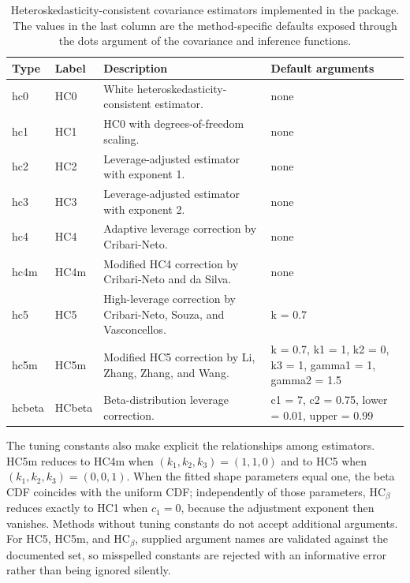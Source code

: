 \begin{table}

\caption{\label{tab:methods}Heteroskedasticity-consistent covariance estimators implemented in the package. The values in the last column are the method-specific defaults exposed through the dots argument of the covariance and inference functions.}
\centering
\begin{tabular}[t]{ll>{\raggedright\arraybackslash}p{5.9cm}>{\raggedright\arraybackslash}p{3.7cm}}
\toprule
Type & Label & Description & Default arguments\\
\midrule
hc0 & HC0 & White heteroskedasticity-consistent estimator. & none\\
hc1 & HC1 & HC0 with degrees-of-freedom scaling. & none\\
hc2 & HC2 & Leverage-adjusted estimator with exponent 1. & none\\
hc3 & HC3 & Leverage-adjusted estimator with exponent 2. & none\\
hc4 & HC4 & Adaptive leverage correction by Cribari-Neto. & none\\
\addlinespace
hc4m & HC4m & Modified HC4 correction by Cribari-Neto and da Silva. & none\\
hc5 & HC5 & High-leverage correction by Cribari-Neto, Souza, and Vasconcellos. & k = 0.7\\
hc5m & HC5m & Modified HC5 correction by Li, Zhang, Zhang, and Wang. & k = 0.7, k1 = 1, k2 = 0, k3 = 1, gamma1 = 1, gamma2 = 1.5\\
hcbeta & HCbeta & Beta-distribution leverage correction. & c1 = 7, c2 = 0.75, lower = 0.01, upper = 0.99\\
\bottomrule
\end{tabular}
\end{table}

The tuning constants also make explicit the relationships among estimators. HC5m reduces to HC4m when \((k_1, k_2, k_3) = (1,1,0)\) and to HC5 when \((k_1, k_2, k_3) = (0,0,1)\). When the fitted shape parameters equal one, the beta CDF coincides with the uniform CDF; independently of those parameters, \(\text{HC}_\beta\) reduces exactly to HC1 when \(c_1=0\), because the adjustment exponent then vanishes. Methods without tuning constants do not accept additional arguments. For HC5, HC5m, and \(\text{HC}_\beta\), supplied argument names are validated against the documented set, so misspelled constants are rejected with an informative error rather than being ignored silently.

